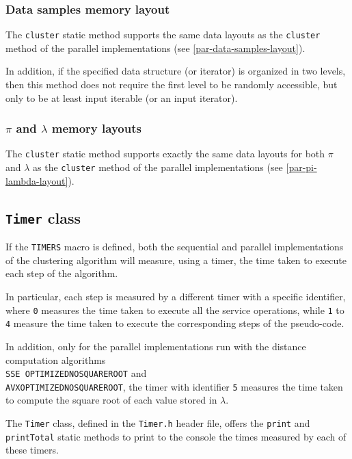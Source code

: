 \documentclass{article}
\begin{document}
\hypertarget{seq-data-samples-layout}{
\subsubsection{Data samples memory layout}
\label{seq-data-samples-layout}}

The \texttt{cluster} static method supports the same data layouts as the \texttt{cluster} method
of the parallel implementations (see \ref{par-data-samples-layout}).

In addition, if the specified data structure (or iterator) is organized in two levels, then this
method does not require the first level to be randomly accessible, but only to be at least input
iterable (or an input iterator).

\hypertarget{seq-pi-lambda-layout}{
\subsubsection{\texorpdfstring{\boldmath$\pi$ and \boldmath$\lambda$}{pi and lambda} memory layouts}
\label{seq-pi-lambda-layout}}

The \texttt{cluster} static method supports exactly the same data layouts for both $\pi$
and $\lambda$ as the \texttt{cluster} method
of the parallel implementations (see \ref{par-pi-lambda-layout}).

\hypertarget{timers}{
\subsection{\texttt{Timer} class}
\label{timer}}

If the \texttt{TIMERS} macro is defined, both the sequential and parallel implementations of the
clustering algorithm will measure, using a timer, the time taken to execute each step of the
algorithm.

In particular, each step is measured by a different timer with a specific identifier, where
\texttt{0} measures the time taken to execute all the service operations, while \texttt{1} to
\texttt{4} measure the time taken to execute the corresponding steps of the pseudo-code.

In addition, only for the parallel implementations run with the distance
computation algorithms\\
\texttt{SSE\textunderscore
OPTIMIZED\textunderscore NO\textunderscore SQUARE\textunderscore ROOT} and\\
\texttt{AVX\textunderscore OPTIMIZED\textunderscore NO\textunderscore SQUARE\textunderscore ROOT},
the timer with identifier \texttt{5} measures the time taken to compute the square root of each
value stored in $\lambda$.

The \texttt{Timer} class, defined in the \texttt{Timer.h} header file, offers the \texttt{print} and
\texttt{printTotal} static methods to print to the console the times measured by each of these
timers.
\end{document}

